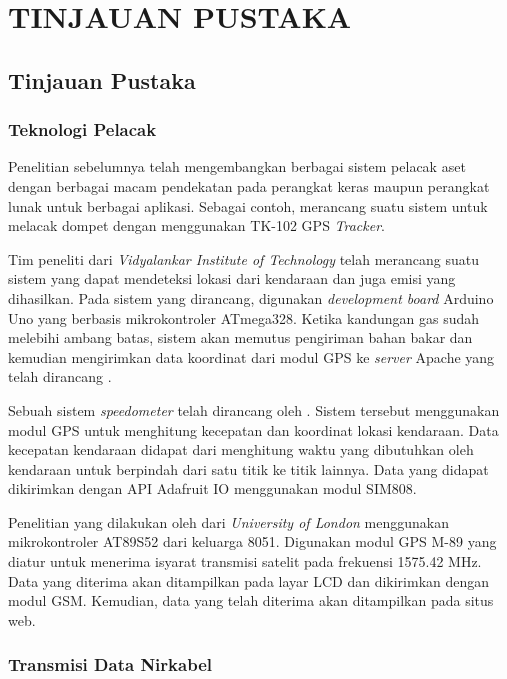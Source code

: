 \chapter{TINJAUAN PUSTAKA}

\section{Tinjauan Pustaka}
\subsection{Teknologi Pelacak}
Penelitian sebelumnya telah mengembangkan berbagai sistem pelacak aset dengan berbagai macam pendekatan pada perangkat keras maupun perangkat lunak untuk berbagai aplikasi. Sebagai contoh, \cite{Ekhsan2022} merancang suatu sistem untuk melacak dompet dengan menggunakan TK-102 GPS \textit{Tracker}.

Tim peneliti dari \textit{Vidyalankar Institute of Technology} telah merancang suatu sistem yang dapat mendeteksi lokasi dari kendaraan dan juga emisi  yang dihasilkan. Pada sistem yang dirancang, digunakan \textit{development board} Arduino Uno yang berbasis mikrokontroler ATmega328. Ketika kandungan gas  sudah melebihi ambang batas, sistem akan memutus pengiriman bahan bakar dan kemudian mengirimkan data koordinat dari modul GPS ke \textit{server} Apache yang telah dirancang \cite{Asha2022}.

Sebuah sistem \textit{speedometer} telah dirancang oleh \cite{Najmurrokhman2021}. Sistem tersebut menggunakan modul GPS untuk menghitung kecepatan dan koordinat lokasi kendaraan. Data kecepatan kendaraan didapat dari menghitung waktu yang dibutuhkan oleh kendaraan untuk berpindah dari satu titik ke titik lainnya. Data yang didapat dikirimkan dengan API Adafruit IO menggunakan modul SIM808.

Penelitian yang dilakukan oleh \cite{Mukhtar2015} dari \textit{University of London} menggunakan mikrokontroler AT89S52 dari keluarga 8051. Digunakan modul GPS M-89 yang diatur untuk menerima isyarat transmisi satelit pada frekuensi 1575.42 MHz. Data yang diterima akan ditampilkan pada layar LCD dan dikirimkan dengan modul GSM. Kemudian, data yang telah diterima akan ditampilkan pada situs web.

\subsection{Transmisi Data Nirkabel}


